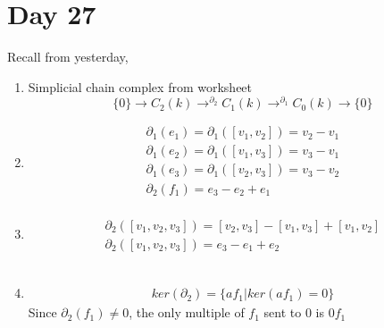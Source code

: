 \documentclass[../notes.tex]{subfiles}
\begin{document}
\section{Day 27}
Recall from yesterday,
\begin{enumerate}
    \item Simplicial chain complex from worksheet
        \[
            \{0\}\rightarrow C_2(k)
            \rightarrow^{\partial_2}C_1(k)
            \rightarrow^{\partial_1}C_0(k)
            \rightarrow \{0\}
        \]
    \item 
        \begin{align*}
            \partial_1(e_1) = \partial_1([v_1,v_2]) = v_2-v_1\\
            \partial_1(e_2) = \partial_1([v_1,v_3]) = v_3-v_1\\
            \partial_1(e_3) = \partial_1([v_2,v_3]) = v_3-v_2\\
            \partial_2(f_1) = e_3 - e_2 + e_1\\
        \end{align*}
    \item 
        \begin{align*}
            \partial_2([v_1,v_2,v_3])=[v_2,v_3]-[v_1,v_3]+[v_1,v_2]\\
            \partial_2([v_1,v_2,v_3])=e_3-e_1+e_2
        \end{align*}\\
        \begin{center}
        \end{center}
    \item 
        \begin{align*}
            ker(\partial_2)=\{af_1| ker(af_1)=0\}
        \end{align*}
        Since $\partial_2(f_1)\neq 0$, the only multiple of $f_1$ sent to 0 is $0f_1$

\end{enumerate}
\end{document}
